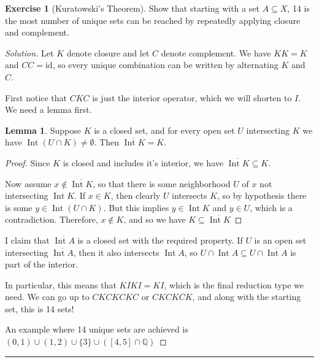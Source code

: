 \documentclass{article}
\theoremstyle{definition}
\newtheorem{exercise}{Exercise}[section]
\newtheorem{lemma}{Lemma}[exercise]
\DeclareMathOperator{\Int}{\mathrm{Int}}
\begin{document}
\begin{exercise}[Kuratowski's Theorem]
  Show that starting with a set $A\subseteq X$, 14 is the most number of unique sets can be reached by repeatedly applying closure and complement.
\end{exercise}
\begin{proof}[Solution]
  Let $K$ denote closure and let $C$ denote complement. We have $KK = K$ and $CC = \mathrm{id}$, so every unique combination can be written by alternating $K$ and $C$.

  First notice that $CKC$ is just the interior operator, which we will shorten to $I$. We need a lemma first.

  \begin{lemma}
    Suppose $K$ is a closed set, and for every open set $U$ intersecting $K$ we have $\Int(U\cap K)\ne\emptyset$. Then $\overline{\Int K} = K$.
  \end{lemma}
  \begin{proof}
    Since $K$ is closed and includes it's interior, we have $\overline{\Int K}\subseteq K$.

    Now assume $x\notin \overline{\Int K}$, so that there is some neighborhood $U$ of $x$ not intersecting $\Int K$. If $x\in K$, then clearly $U$ intersects $K$, so by hypothesis there is some $y\in\Int(U\cap K)$. But this implies $y\in \Int K$ and $y\in U$, which is a contradiction. Therefore, $x\notin K$, and so we have $K\subseteq\overline{\Int K}$
  \end{proof}

  I claim that $\overline{\Int A}$ is a closed set with the required property. If $U$ is an open set intersecting $\overline{\Int A}$, then it also intersects $\Int A$, so $U\cap\Int A\subseteq U\cap\overline{\Int A}$ is part of the interior.
  
  In particular, this means that $KIKI = KI$, which is the final reduction type we need. We can go up to $CKCKCKC$ or $CKCKCK$, and along with the starting set, this is 14 sets!

  An example where 14 unique sets are achieved is $(0,1)\cup(1,2)\cup\{3\}\cup([4,5]\cap\mathbb{Q})$
\end{proof}

\hrule
\end{document}
